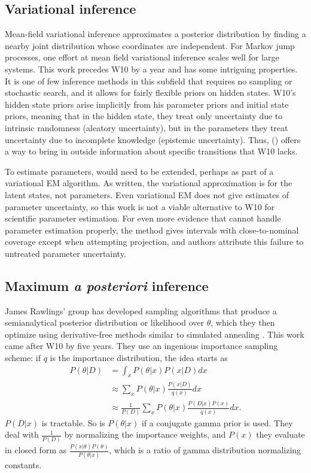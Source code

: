 \documentclass{article}
\begin{document}
\subsection{Variational inference}
Mean-field variational inference approximates a posterior distribution by finding a nearby joint distribution whose coordinates are independent. For Markov jump processes, one effort at mean field variational inference \cite{opper2008variational} scales well for large systems. This work precedes W10 by a year and has some intriguing properties. It is one of few inference methods in this subfield that requires no sampling or stochastic search, and it allows for fairly flexible priors on hidden states. W10's hidden state priors arise implicitly from his parameter priors and initial state priors, meaning that in the hidden state, they treat only uncertainty due to intrinsic randomness (aleatory uncertainty), but in the parameters they treat uncertainty due to incomplete knowledge (epistemic uncertainty). Thus, (\cite{opper2008variational}) offers a way to bring in outside information about specific transitions that W10 lacks.

To estimate parameters, \cite{opper2008variational} would need to be extended, perhaps as part of a variational EM algorithm. As written, the variational approximation is for the latent states, not parameters. Even variational EM does not give estimates of parameter uncertainty, so this work is not a viable alternative to W10 for scientific parameter estimation. For even more evidence that \cite{opper2008variational} cannot handle parameter estimation properly, the method gives intervals with close-to-nominal coverage except when attempting projection, and authors attribute this failure to untreated parameter uncertainty. 

\subsection{Maximum \textit{\textbf{ a posteriori}} inference}
James Rawlings' group has developed sampling algorithms that produce a semianalytical posterior distribution or likelihood over $\theta$, which they then optimize using derivative-free methods similar to simulated annealing \cite{gupta2014comparison,srivastava_rawlings2014stoch_opt}.   This work came after W10 by five years. They use an ingenious importance sampling scheme: if $q$ is the importance distribution, the idea starts as
\begin{align*}
P(\theta|D) &= \int_x P(\theta|x)P(x|D) dx\\
&\approx \sum_x P(\theta|x)\frac{P(x|D)}{q(x)} dx\\
&\approx \frac{1}{P(D)}\sum_x P(\theta|x)\frac{P(D|x)P(x)}{q(x)} dx.
\end{align*}
$P(D|x)$ is tractable. So is $P(\theta|x)$ if a conjugate gamma prior is used. They deal with $\frac{1}{P(D)}$ by normalizing the importance weights, and $P(x)$ they evaluate in closed form as $\frac{P(x|\theta)P(\theta)}{P(\theta|x)}$, which is a ratio of gamma distribution normalizing constants. 
\end{document}
